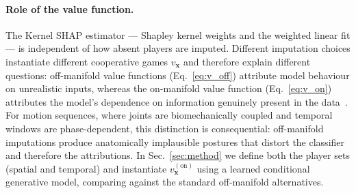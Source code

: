 \paragraph{Role of the value function.}
The Kernel SHAP estimator — Shapley kernel weights and the weighted linear fit — is independent of how absent players are imputed. Different imputation choices instantiate different cooperative games $v_\mathbf{x}$ and therefore explain different questions: off-manifold value functions (Eq.~\ref{eq:v_off}) attribute model behaviour on unrealistic inputs, whereas the on-manifold value function (Eq.~\ref{eq:v_on}) attributes the model's dependence on information genuinely present in the data~\citep{frye2020shapley}.
For motion sequences, where joints are biomechanically coupled and temporal windows are phase-dependent, this distinction is consequential: off-manifold imputations produce anatomically implausible postures that distort the classifier and therefore the attributions. In Sec.~\ref{sec:method} we define both the player sets (spatial and temporal) and instantiate $v^{(\mathrm{on})}_\mathbf{x}$ using a learned conditional generative model, comparing against the standard off-manifold alternatives.